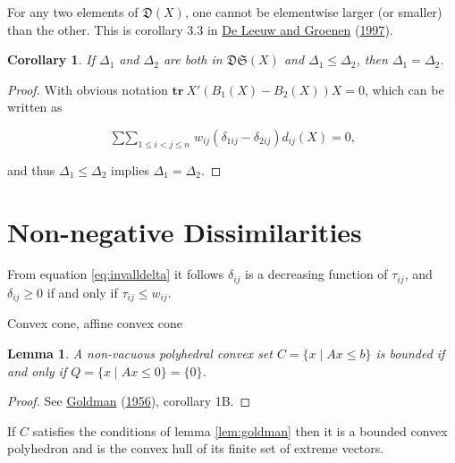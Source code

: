 \documentclass[
  12pt,
]{book}
\newtheorem{lemma}{Lemma}[chapter]
\newtheorem{corollary}{Corollary}[chapter]
\theoremstyle{definition}
\theoremstyle{definition}
\theoremstyle{definition}
\theoremstyle{definition}
\theoremstyle{remark}
\begin{document}
For any two elements of \(\mathfrak{D}(X)\), one cannot be elementwise larger (or smaller) than the other. This is corollary 3.3 in \protect\hyperlink{ref-deleeuw_groenen_A_97}{De Leeuw and Groenen} (\protect\hyperlink{ref-deleeuw_groenen_A_97}{1997}).

\begin{corollary}
\protect\hypertarget{cor:dominate}{}{\label{cor:dominate} }If \(\Delta_1\) and \(\Delta_2\) are both in \(\mathfrak{DS}(X)\) and \(\Delta_1\leq\Delta_2\), then \(\Delta_1=\Delta_2\).
\end{corollary}

\begin{proof}
With obvious notation \(\mathbf{tr}\ X'(B_1(X)-B_2(X))X=0\), which can be written as

\begin{equation}
\mathop{\sum\sum}_{1\leq i<j\leq n} w_{ij}\left(\delta_{1ij}-\delta_{2ij}\right)d_{ij}(X)=0,
\label{eq:invcompare}
\end{equation}

and thus \(\Delta_1\leq\Delta_2\) implies \(\Delta_1=\Delta_2\).
\end{proof}

\hypertarget{non-negative-dissimilarities}{%
\section{Non-negative Dissimilarities}\label{non-negative-dissimilarities}}

From equation \eqref{eq:invalldelta} it follows \(\delta_{ij}\) is a decreasing function of \(\tau_{ij}\), and \(\delta_{ij}\geq 0\) if and only if \(\tau_{ij}\leq w_{ij}\).

Convex cone, affine convex cone

\begin{lemma}
\protect\hypertarget{lem:goldman}{}{\label{lem:goldman} }A non-vacuous polyhedral convex set \(C=\{x\mid Ax\leq b\}\) is bounded if and only if \(Q=\{x\mid Ax\leq 0\}=\{0\}\).
\end{lemma}

\begin{proof}
See \protect\hyperlink{ref-goldman_56}{Goldman} (\protect\hyperlink{ref-goldman_56}{1956}), corollary 1B.
\end{proof}

If \(C\) satisfies the conditions of lemma \ref{lem:goldman} then it is a bounded convex polyhedron and is the convex hull of its finite set of extreme vectors.
\end{document}
